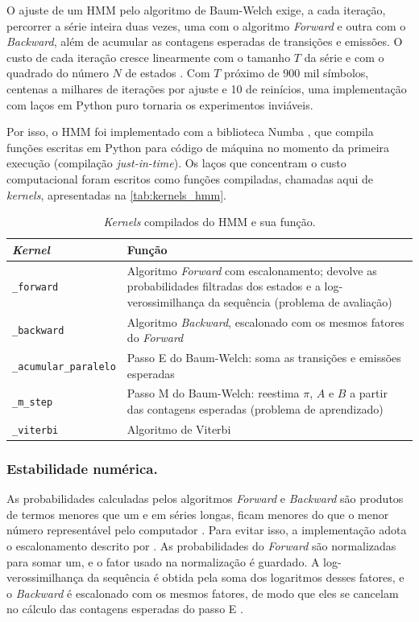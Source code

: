 \documentclass[
    12pt,                %
    openright,           %
    oneside,             %
    a4paper,             %
    english,             %
    brazil               %
]{abntex2}
\begin{document}
O ajuste de um HMM pelo algoritmo de Baum-Welch exige, a cada iteração, percorrer a série inteira duas vezes, 
uma com o algoritmo \textit{Forward} e outra com o \textit{Backward}, além de acumular as contagens 
esperadas de transições e emissões. O custo de cada iteração cresce linearmente com o tamanho $T$ da série 
e com o quadrado do número $N$ de estados \cite{Rabiner1989}. Com $T$ próximo de $900$ mil símbolos, centenas a milhares de 
iterações por ajuste e 10 de reinícios, uma implementação com laços em 
Python puro tornaria os experimentos inviáveis.

Por isso, o HMM foi implementado com a biblioteca Numba \cite{lam2015numba}, que compila funções escritas em 
Python para código de máquina no momento da primeira execução (compilação \textit{just-in-time}). 
Os laços que concentram o custo computacional foram escritos como funções compiladas, chamadas aqui de \textit{kernels}, 
apresentadas na \autoref{tab:kernels_hmm}. 

\begin{table}[htbp]
    \centering
    \caption{\textit{Kernels} compilados do HMM e sua função.}
    \label{tab:kernels_hmm}
    \small
    \begin{tabular}{@{}p{}p{}@{}}
        \toprule
        \textbf{\textit{Kernel}} & \textbf{Função} \\
        \midrule
        \texttt{\_forward} & Algoritmo \textit{Forward} com escalonamento; devolve as probabilidades filtradas dos estados e a log-verossimilhança da sequência (problema de avaliação) \\
        \texttt{\_backward} & Algoritmo \textit{Backward}, escalonado com os mesmos fatores do \textit{Forward} \\
        \texttt{\_acumular\_paralelo} & Passo E do Baum-Welch: soma as transições e emissões esperadas \\
        \texttt{\_m\_step} & Passo M do Baum-Welch: reestima $\pi$, $A$ e $B$ a partir das contagens esperadas (problema de aprendizado) \\
        \texttt{\_viterbi} & Algoritmo de Viterbi \\
        \bottomrule
    \end{tabular}
\end{table}

\subsubsection{Estabilidade numérica.} As probabilidades calculadas pelos algoritmos \textit{Forward} e \textit{Backward} 
são produtos de termos menores que um e em séries longas, ficam menores do que o menor 
número representável pelo computador \cite{Rabiner1989,jm3}. Para evitar isso, a implementação adota o escalonamento 
descrito por . As probabilidades do \textit{Forward} são normalizadas para somar um, 
e o fator usado na normalização é guardado. 
A log-verossimilhança da sequência é obtida pela soma dos logaritmos desses fatores, e o \textit{Backward} é 
escalonado com os mesmos fatores, de modo que eles se cancelam no cálculo das contagens esperadas do passo E \cite{Rabiner1989}. 
\end{document}

